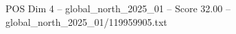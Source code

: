 \begin{textsample}{POS Dim 4 – global\_north\_2025\_01 – Score 32.00 – global\_north\_2025\_01/119959905.txt}
\end{textsample}
